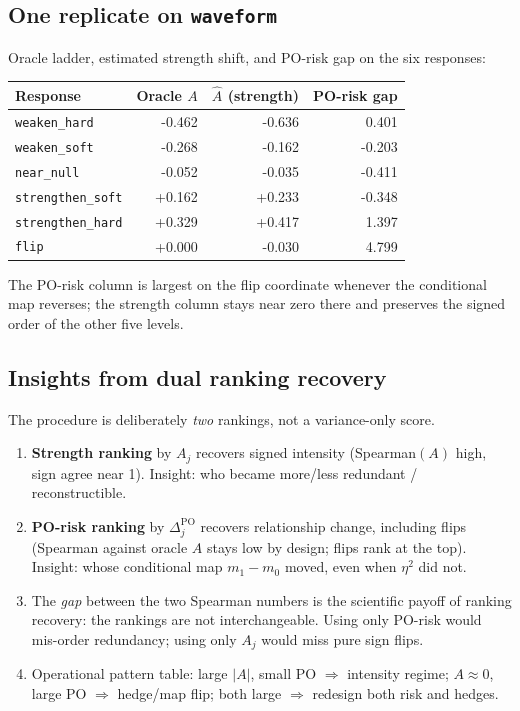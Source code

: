 \documentclass[11pt]{article}
\begin{document}
\subsection*{One replicate on \texttt{waveform}}

Oracle ladder, estimated strength shift, and PO-risk gap on the six responses:
\begin{center}
\begin{tabular}{lrrr}
\toprule
Response & Oracle $A$ & $\widehat A$ (strength) & PO-risk gap \\
\midrule
\texttt{weaken\_hard} & -0.462 & -0.636 & 0.401 \\
\texttt{weaken\_soft} & -0.268 & -0.162 & -0.203 \\
\texttt{near\_null} & -0.052 & -0.035 & -0.411 \\
\texttt{strengthen\_soft} & +0.162 & +0.233 & -0.348 \\
\texttt{strengthen\_hard} & +0.329 & +0.417 & 1.397 \\
\texttt{flip} & +0.000 & -0.030 & 4.799 \\
\bottomrule
\end{tabular}
\end{center}

The PO-risk column is largest on the flip coordinate whenever the conditional map reverses; the strength column stays near zero there and preserves the signed order of the other five levels.

\subsection*{Insights from dual ranking recovery}

The procedure is deliberately \emph{two} rankings, not a variance-only score.
\begin{enumerate}[leftmargin=*]
\item \textbf{Strength ranking} by $A_j$ recovers signed intensity (Spearman$(A)$ high, sign agree near 1).
Insight: who became more/less redundant / reconstructible.
\item \textbf{PO-risk ranking} by $\Delta^{\mathrm{PO}}_j$ recovers relationship change, including flips
(Spearman against oracle $A$ stays low by design; flips rank at the top).
Insight: whose conditional map $m_1-m_0$ moved, even when $\eta^2$ did not.
\item The \emph{gap} between the two Spearman numbers is the scientific payoff of ranking recovery:
the rankings are not interchangeable. Using only PO-risk would mis-order redundancy;
using only $A_j$ would miss pure sign flips.
\item Operational pattern table: large $|A|$, small PO $\Rightarrow$ intensity regime;
$A\approx 0$, large PO $\Rightarrow$ hedge/map flip; both large $\Rightarrow$ redesign both risk and hedges.
\end{enumerate}
\end{document}
